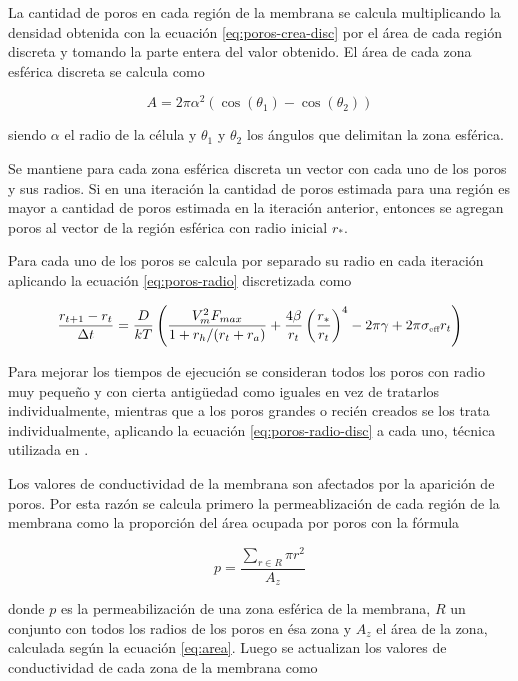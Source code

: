 La cantidad de poros en cada región de la membrana se calcula multiplicando la densidad obtenida con la ecuación \ref{eq:poros-crea-disc} por el área de cada región discreta y tomando la parte entera del valor obtenido. El área de cada zona esférica discreta se calcula como 

\begin{equation} \label{eq:area}
	A = 2 \pi \alpha^2 (\cos(\theta_1) - \cos(\theta_2))
\end{equation}

siendo $\alpha$ el radio de la célula y $\theta_1$ y $\theta_2$ los ángulos que delimitan la zona esférica.

Se mantiene para cada zona esférica discreta un vector con cada uno de los poros y sus radios. Si en una iteración la cantidad de poros estimada para una región es mayor a cantidad de poros estimada en la iteración anterior, entonces se agregan poros al vector de la región esférica con radio inicial $r_*$.

Para cada uno de los poros se calcula por separado su radio en cada iteración aplicando la ecuación \ref{eq:poros-radio} discretizada como

\begin{equation} \label{eq:poros-radio-disc}
	\frac{r_{t+1} - r_t}{\Delta t} = \frac{D}{kT} \left( \frac{V_m^2 F_{max}}{1+r_h / (r_t+r_a)} + \frac{4 \beta}{r_t} \left(\frac{r_*}{r_t}\right)^4 - 2 \pi \gamma + 2 \pi \sigma_{\textrm{\tiny eff}} r_t \right)
\end{equation}

Para mejorar los tiempos de ejecución se consideran todos los poros con radio muy pequeño y con cierta antigüedad como iguales en vez de tratarlos individualmente, mientras que a los poros grandes o recién creados se los trata individualmente, aplicando la ecuación \ref{eq:poros-radio-disc} a cada uno, técnica utilizada en \cite{krass07}.

Los valores de conductividad de la membrana son afectados por la aparición de poros. Por esta razón se calcula primero la permeablización de cada región de la membrana como la proporción del área ocupada por poros con la fórmula

\begin{equation} 
    p = \frac{ \sum\limits_{r \in R} \pi r^2 }{A_z}
\end{equation} 

donde $p$ es la permeabilización de una zona esférica de la membrana, $R$ un conjunto con todos los radios de los poros en ésa zona y $A_z$ el área de la zona, calculada según la ecuación \ref{eq:area}. Luego se actualizan los valores de conductividad de cada zona de la membrana como

